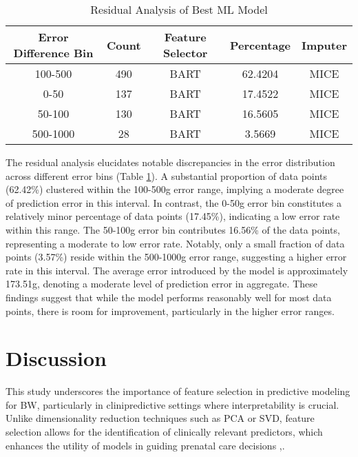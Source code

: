 \documentclass[12pt]{article}
\begin{document}

\begin{table}[h]
\centering
\caption{Residual Analysis of Best ML Model}
\begin{tabular}{|c|c|c|c|c|}
\hline
\textbf{Error Difference Bin} & \textbf{Count} & \textbf{Feature Selector} & \textbf{Percentage} & \textbf{Imputer} \\
\hline
100-500 & 490 & BART & 62.4204 & MICE \\
\hline
0-50   & 137 & BART & 17.4522 & MICE \\
\hline
50-100 & 130 & BART & 16.5605 & MICE \\
\hline
500-1000 & 28  & BART & 3.5669  & MICE \\
\hline
\end{tabular}
\label{tab:Residual analysis}
\end{table}

The residual analysis elucidates notable discrepancies in the error distribution across different error bins (Table \ref{tab:Residual analysis}). A substantial proportion of data points (62.42\%) clustered within the 100-500g error range, implying a moderate degree of prediction error in this interval. In contrast, the 0-50g error bin constitutes a relatively minor percentage of data points (17.45\%), indicating a low error rate within this range. The 50-100g error bin contributes 16.56\% of the data points, representing a moderate to low error rate. Notably, only a small fraction of data points (3.57\%) reside within the 500-1000g error range, suggesting a higher error rate in this interval.
The average error introduced by the model is approximately 173.51g, denoting a moderate level of prediction error in aggregate. These findings suggest that while the model performs reasonably well for most data points, there is room for improvement, particularly in the higher error ranges.

\section{Discussion}
This study underscores the importance of feature selection in predictive modeling for BW, particularly in clinipredictive settings where interpretability is crucial. Unlike dimensionality reduction techniques such as PCA or SVD, feature selection allows for the identification of clinically relevant predictors, which enhances the utility of models in guiding prenatal care decisions \cite{6A},\cite{29A}.
\end{document}
